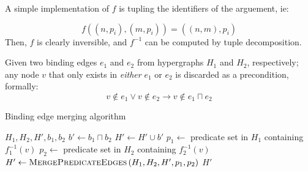 \documentclass[../Master.tex]{subfiles}
\begin{document}
 A simple implementation of $f$ is tupling the identifiers of the arguement, ie:

\begin{equation*}
    f\left( \left(n, p_i \right), \left(m, p_i \right) \right) =
        \left( (n,m), p_i \right)
\end{equation*}
Then, $f$ is clearly inversible, and $f^{-1}$ can be computed by tuple decomposition.



\begin{proposition}
    Given two binding edges $e_1$ and $e_2$ from hypergraphs $H_1$ and $H_2$, respectively; any node $v$ that only exists in \emph{either} $e_1$ or $e_2$ is discarded as a precondition, formally:
    \begin{equation*}
        v \notin e_1 \lor v \notin e_2 \rightarrow v \notin e_1 \sqcap e_2
    \end{equation*}
\end{proposition}



\begin{algorithm}
    \caption{Binding edge merging algorithm}
    \label{algo:bindingedgemerge}
    \begin{algorithmic}
         {$H_1, H_2, H', b_1, b_2$}
            \State $b' \gets b_1 \sqcap b_2$
            \State $H' \gets H' \cup b'$
                    \State $p_1 \gets$ predicate set in $H_1$ containing $f_1^{-1}(v)$
                    \State $p_2 \gets$ predicate set in $H_2$ containing $f_2^{-1}(v)$
                    \State $H' \gets \textsc{MergePredicateEdges}
                                        \left( H_1, H_2, H', p_1, p_2 \right)$
                \EndIf
            \EndFor
            \State \Return $H'$
        \EndFunction
    \end{algorithmic}
\end{algorithm}
\end{document}
